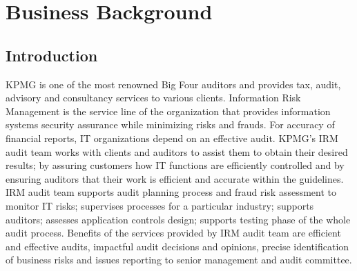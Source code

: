 %
%
%
%

\chapter{Business Background}\label{C.Business.Background}

\section{Introduction}\label{S.intro2}
KPMG is one of the most renowned Big Four auditors and provides tax, audit, advisory and consultancy services to various clients. Information Risk Management is the service line of the organization that provides information systems security assurance while minimizing risks and frauds. For accuracy of financial reports, IT organizations depend on an effective audit. KPMG's IRM audit team works with clients and auditors to assist them to obtain their desired results; by assuring customers how IT functions are efficiently controlled and by ensuring auditors that their work is efficient and accurate within the guidelines. IRM audit team supports audit planning process and fraud risk assessment to monitor IT risks; supervises processes for a particular industry; supports auditors; assesses application controls design; supports testing phase of the whole audit process. Benefits of the services provided by IRM audit team are efficient and effective audits, impactful audit decisions and opinions, precise identification of business risks and issues reporting to senior management and audit committee.\\

